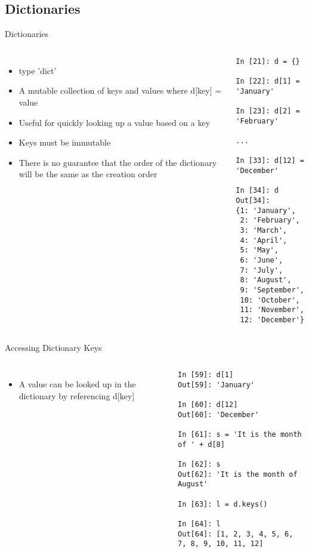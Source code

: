 \documentclass{beamer}
\begin{document}
\subsection{Dictionaries}
\begin{frame}[fragile]{Dictionaries}
\begin{columns}[c]
\column{2.5in}
\begin{itemize}
\item{type 'dict'}
\item{A mutable collection of keys and values where d[key] = value}
\item{Useful for quickly looking up a value based on a key}
\item{Keys must be immutable}
\item{There is no guarantee that the order of the dictionary will be the same as the creation order}
\end{itemize}

\column{2.5in}
\tiny
\begin{lstlisting}
In [21]: d = {}

In [22]: d[1] = 'January'

In [23]: d[2] = 'February'

...

In [33]: d[12] = 'December'

In [34]: d
Out[34]:
{1: 'January',
 2: 'February',
 3: 'March',
 4: 'April',
 5: 'May',
 6: 'June',
 7: 'July',
 8: 'August',
 9: 'September',
 10: 'October',
 11: 'November',
 12: 'December'}
\end{lstlisting}
\end{columns}
\end{frame}


\begin{frame}[fragile]{Accessing Dictionary Keys}
\begin{columns}[c]
\column{2.5in}
\begin{itemize}
\item{A value can be looked up in the dictionary by referencing d[key]}
\end{itemize}

\column{2.5in}
\begin{lstlisting}
In [59]: d[1]
Out[59]: 'January'

In [60]: d[12]
Out[60]: 'December'

In [61]: s = 'It is the month of ' + d[8]

In [62]: s
Out[62]: 'It is the month of August'

In [63]: l = d.keys()

In [64]: l
Out[64]: [1, 2, 3, 4, 5, 6, 7, 8, 9, 10, 11, 12]
\end{lstlisting}
\end{columns}
\end{frame}
\end{document}
